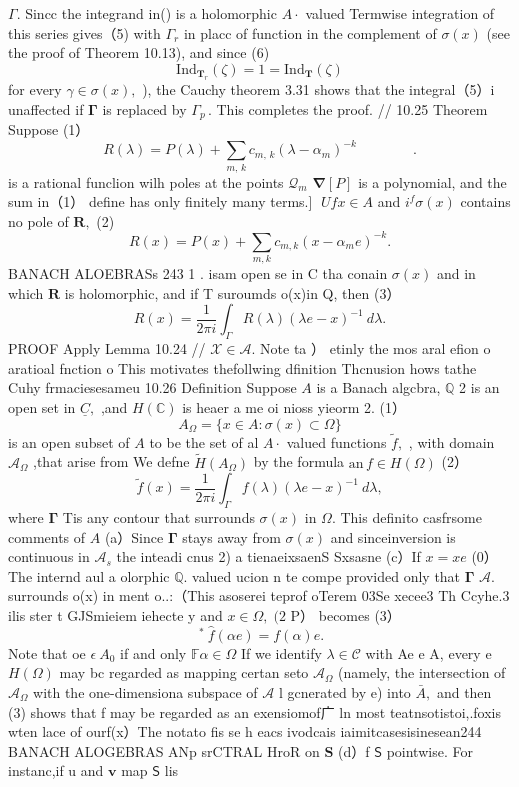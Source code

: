$\textstyle\Gamma.$ Sincc the integrand in() is a holomorphic $A\!\cdot\!$ valued Termwise integration of this series gives（5) with $\Gamma_{r}$ in placc of function in the complement of $\sigma(x)$ (see the proof of Theorem 10.13), and since (6) $$ {\mathrm{Ind}}_{{\mathbf{T}}_{r}}(\zeta)=1={\mathrm{Ind}}_{\mathbf{T}}\left(\zeta\right) $$ for every $\gamma\in\sigma(x),$ ), the Cauchy theorem 3.31 shows that the integral（5）i unaffected if ${\boldsymbol{\Gamma}}$ is replaced by $\Gamma_{p}\,.$ This completes the proof. // 10.25 Theorem Suppose (1） $$ R(\lambda)=P(\lambda)+\sum_{m,\,k}c_{m,\,k}(\lambda-\alpha_{m})^{-k}\qquad\qquad. $$ is a rational funclion wilh poles at the points ${\mathcal{Q}}_{m}$ $\mathbf{\nabla}[P]$ is a polynomial, and the sum in（1） define has only finitely many terms.] $\;U f x\in A$ and $i^{f}\sigma(x)$ contains no pole of ${\boldsymbol{R}},$ (2) $$ R(x)=P(x)+\sum_{m,k}c_{m,k}(x-\alpha_{m}e)^{-k}. $$BANACH ALOEBRASs 243 1 . isam open se in C tha conain $\sigma(x)$ and in which ${\boldsymbol{R}}$ is holomorphic, and if T suroumds o(x)in Q, then (3） $$ R(x)={\frac{1}{2\pi i}}\int_{\Gamma}R(\lambda)(\lambda e-x)^{-1}~d\lambda. $$ PROOF Apply Lemma 10.24 // ${\mathcal{X}}\in{\mathcal{A}}.$ Note ta ） etinly the mos aral efion o aratioal fnction o This motivates thefollwing dfinition Thcnusion hows tathe Cuhy frmaciesesameu 10.26 Definition Suppose $\textstyle A$ is a Banach algcbra, $\mathbb{Q}$ 2 is an open set in ${\underline{{C}}},$ ,and $H(\mathbb{C})$ is heaer a me oi nioss yieorm 2. (1） $$ A_{\Omega}=\{x\in A\colon\sigma(x)\subset\Omega\} $$ is an open subset of $\scriptstyle A$ to be the set of al $A\!\cdot\!$ valued functions ${\tilde{f}},$ , with domain ${\mathcal{A}}_{\Omega}$ ,that arise from We defne ${\widetilde{H}}(A_{\Omega})$ by the formula $\mathrm{an}\,f\in H(\Omega)$ (2） $$ \tilde{f}(x)=\frac{1}{2\pi i}\int_{\Gamma}f(\lambda)(\lambda e-x)^{-1}~d\lambda, $$ where $\boldsymbol{\Gamma}$ Tis any contour that surrounds $\sigma(x)$ in $\Omega.$ This definito casfrsome comments of $\textstyle A$ (a）Since $\boldsymbol{\Gamma}$ stays away from $\sigma(x)$ and sinceinversion is continuous in ${\mathcal{A}}_{s}$ the inteadi cnus 2) a tienaeixsaenS Sxsasne (c）If $x=x e$ (0）The internd aul a olorphic $\mathbb{Q}.$ valued ucion n te compe provided only that ${\boldsymbol{\Gamma}}$ ${\mathcal{A}}.$ surrounds o(x) in ment o..:（This asoserei teprof oTerem 03Se xecee3 Th Ccyhe.3 ilis ster t GJSmieiem iehecte y and $x\in\Omega,\;(2$ P） becomes (3） $$ \ ^{*}\ {\widehat{f}}(\alpha e)=f(\alpha)e. $$ Note that oe $\scriptstyle\epsilon\:A_{0}$ if and only $\mathbb{F}\alpha\in\Omega$ If we identify $\lambda\in{\mathcal{C}}$ with Ae e A, every e $H(\Omega)$ may bc regarded as mapping certan seto ${\mathcal{A}}_{\Omega}$ (namely, the intersection of ${\mathcal{A}}_{\Omega}$ with the one-dimensiona subspace of $\textstyle{\mathcal{A}}$ l gcnerated by e) into ${\bar{A}},$ and then (3) shows that f may be regarded as an exensiomof广 ln most teatnsotistoi,.foxis wten lace of ourf(x）The notato fis se h eacs ivodcais iaimitcasesisinesean244 BANACH ALOGEBRAS ANp srCTRAL HroR on $\boldsymbol{S}$ (d）f $\boldsymbol{\mathsf{S}}$ pointwise. For instanc,if u and $\boldsymbol{v}$ map $\boldsymbol{\mathsf{S}}$ lis 